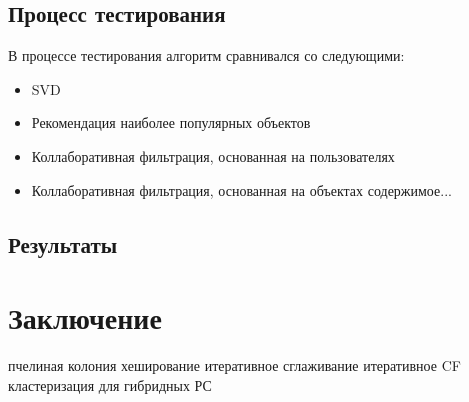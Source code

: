 \documentclass[12pt]{article} %
\begin{document}
\subsection{Процесс тестирования}
В процессе тестирования алгоритм сравнивался со следующими:
\begin{itemize}
\item SVD
\item Рекомендация наиболее популярных объектов
\item Коллаборативная фильтрация, основанная на пользователях
\item Коллаборативная фильтрация, основанная на объектах
содержимое...
\end{itemize}


\subsection{Результаты}

\section{Заключение}

\begin{thebibliography}{99}
 пчелиная колония
 хеширование
 итеративное сглаживание
 итеративное CF
 кластеризация для гибридных РС

\end{thebibliography}
\end{document}
